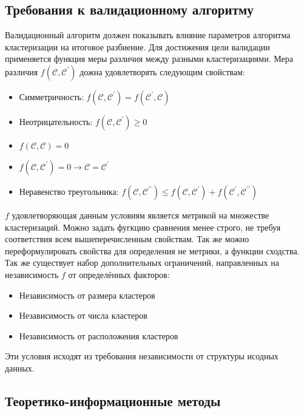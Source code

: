 \subsection{Требования к валидационному алгоритму}
Валидационный алгоритм должен показывать влияние параметров алгоритма кластеризации на итоговое разбиение. Для достижения цели валидации применяется функция меры различия между разными кластеризациями\cite{wagner2007comparing}. Мера различия $f(\mathcal{C, C^\prime})$ дожна удовлетворять следующим свойствам:
\begin{itemize}
	\item Симметричность: $f(\mathcal{C, C^\prime}) = f(\mathcal{C^\prime, C})$
	\item Неотрицательность: $f(\mathcal{C, C^\prime}) \geq 0$
	\item $f(\mathcal{C, C}) = 0$
	\item $f(\mathcal{C, C^\prime}) = 0 \rightarrow \mathcal{C = C^\prime}$
	\item Неравенство треугольника: $f(\mathcal{C, C^{\prime\prime}}) \leq f(\mathcal{C, C^{\prime}}) + f(\mathcal{C^{\prime}, C^{\prime\prime}})$
\end{itemize}

$f$ удовлетворяющая данным условиям является метрикой на множестве кластеризаций. Можно задать фугкцию сравнения менее строго, не требуя соответствия всем вышеперечисленным свойствам. Так же можно переформулировать свойства для определения не метрики, а функции сходства. Так же существует набор дополнительных ограничений, направленных на независимость $f$ от определённых факторов:
\begin{itemize}
	\item Независимость от размера кластеров
	\item Независимость от числа кластеров
	\item Независимость от расположения кластеров
\end{itemize}

Эти условия исходят из требования независимости от структуры исодных данных.

\subsection{Теоретико-информационные методы} 
